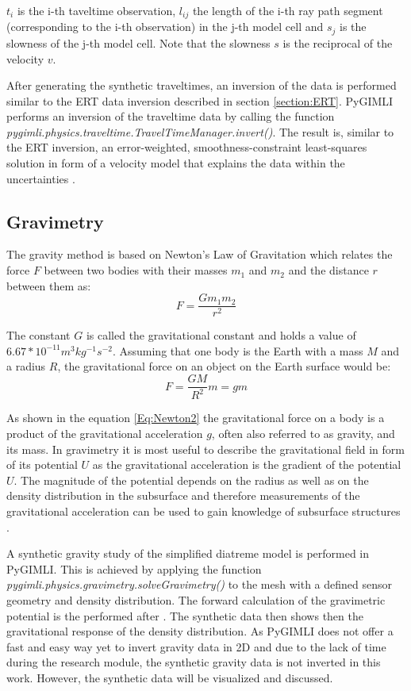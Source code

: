 $t_i$ is the i-th taveltime observation, $l_{ij}$ the length of the i-th ray path segment (corresponding to the i-th observation) in the j-th model cell and $s_j$ is the slowness of the j-th model cell. Note that the slowness $s$ is the reciprocal of the velocity $v$. 

After generating the synthetic traveltimes, an inversion of the data is performed similar to the ERT data inversion described in section \ref{section:ERT}. PyGIMLI performs an inversion of the traveltime data by calling the function \textit{pygimli.physics.traveltime.TravelTimeManager.invert()}. The result is, similar to the ERT inversion, an error-weighted, smoothness-constraint least-squares solution in form of a velocity model that explains the data within the uncertainties \citep{Ruecker2017}.


\subsection{Gravimetry}\label{section:Gravimetry}
The gravity method is based on Newton's Law of Gravitation which relates the force $F$ between two bodies with their masses $m_1$ and $m_2$ and the distance $r$ between them as:
\begin{equation}
    F = \frac{Gm_1 m_2}{r^2}
    \label{Eq:Newton1}
\end{equation}

The constant $G$ is called the gravitational constant and holds a value of $6.67*10^{-11}m^{3}kg^{-1}s^{-2}$. Assuming that one body is the Earth with a mass $M$ and a radius $R$, the gravitational force on an object on the Earth surface would be:
\begin{equation}
    F = \frac{GM}{R^2}m = gm
    \label{Eq:Newton2}
\end{equation}

As shown in the equation \ref{Eq:Newton2} the gravitational force on a body is a product of the gravitational acceleration $g$, often also referred to as gravity, and its mass. In gravimetry it is most useful to describe the gravitational field in form of its potential $U$ as the gravitational acceleration is the gradient of the potential $U$. The magnitude of the potential depends on the radius as well as on the density distribution in the subsurface and therefore measurements of the gravitational acceleration can be used to gain knowledge of subsurface structures \citep{kearey2002introduction}.

A synthetic gravity study of the simplified diatreme model is performed in PyGIMLI. This is achieved by applying the function \textit{pygimli.physics.gravimetry.solveGravimetry()} to the mesh with a defined sensor geometry and density distribution. The forward calculation of the gravimetric potential is the performed after \citet{won1987computing}. The synthetic data then shows then the gravitational response of the density distribution. As PyGIMLI does not offer a fast and easy way yet to invert gravity data in 2D and due to the lack of time during the research module, the synthetic gravity data is not inverted in this work. However, the synthetic data will be visualized and discussed.

